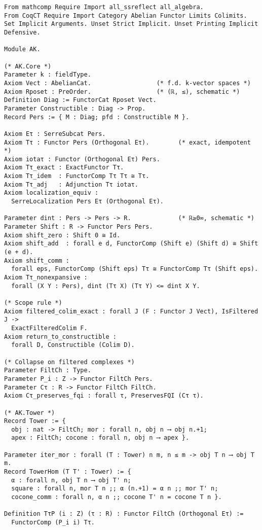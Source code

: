 \documentclass[11pt]{article}
\numberwithin{equation}{section}
\theoremstyle{plain}
\theoremstyle{definition}
\theoremstyle{remark}
\theoremstyle{plain}
\theoremstyle{definition}
\numberwithin{equation}{section}
\theoremstyle{definition}
\numberwithin{equation}{section}
\theoremstyle{plain}
\theoremstyle{definition}
\theoremstyle{remark}
\begin{document}
\begin{verbatim}
From mathcomp Require Import all_ssreflect all_algebra.
From CoqCT Require Import Category Abelian Functor Limits Colimits.
Set Implicit Arguments. Unset Strict Implicit. Unset Printing Implicit Defensive.

Module AK.

(* AK.Core *)
Parameter k : fieldType.
Axiom Vect : AbelianCat.                  (* f.d. k-vector spaces *)
Axiom Rposet : PreOrder.                  (* (ℝ, ≤), schematic *)
Definition Diag := FunctorCat Rposet Vect.
Parameter Constructible : Diag -> Prop.
Record Pers := { M : Diag; pfd : Constructible M }.

Axiom Eτ : SerreSubcat Pers.
Axiom Tτ : Functor Pers (Orthogonal Eτ).        (* exact, idempotent *)
Axiom iotaτ : Functor (Orthogonal Eτ) Pers.
Axiom Tτ_exact : ExactFunctor Tτ.
Axiom Tτ_idem  : FunctorComp Tτ Tτ ≅ Tτ.
Axiom Tτ_adj   : Adjunction Tτ iotaτ.
Axiom localization_equiv :
  SerreLocalization Pers Eτ (Orthogonal Eτ).

Parameter dint : Pers -> Pers -> R.             (* ℝ≥0∞, schematic *)
Parameter Shift : R -> Functor Pers Pers.
Axiom shift_zero : Shift 0 ≅ Id.
Axiom shift_add  : forall e d, FunctorComp (Shift e) (Shift d) ≅ Shift (e + d).
Axiom shift_comm :
  forall eps, FunctorComp (Shift eps) Tτ ≅ FunctorComp Tτ (Shift eps).
Axiom Tτ_nonexpansive :
  forall (X Y : Pers), dint (Tτ X) (Tτ Y) <= dint X Y.

(* Scope rule *)
Axiom filtered_colim_exact : forall J (F : Functor J Vect), IsFiltered J ->
  ExactFilteredColim F.
Axiom return_to_constructible :
  forall D, Constructible (Colim D).

(* Collapse on filtered complexes *)
Parameter FiltCh : Type.
Parameter P_i : Z -> Functor FiltCh Pers.
Parameter Cτ : R -> Functor FiltCh FiltCh.
Axiom Cτ_preserves_fqi : forall τ, PreservesFQI (Cτ τ).

(* AK.Tower *)
Record Tower := {
  obj : nat -> FiltCh; mor : forall n, obj n ⟶ obj n.+1;
  apex : FiltCh; cocone : forall n, obj n ⟶ apex }.

Parameter iter_mor : forall (T : Tower) n m, n ≤ m -> obj T n ⟶ obj T m.
Record TowerHom (T T' : Tower) := {
  α : forall n, obj T n ⟶ obj T' n;
  square : forall n, mor T n ;; α (n.+1) = α n ;; mor T' n;
  cocone_comm : forall n, α n ;; cocone T' n = cocone T n }.

Definition TτP (i : Z) (τ : R) : Functor FiltCh (Orthogonal Eτ) :=
  FunctorComp (P_i i) Tτ.


\end{verbatim}
\end{document}
